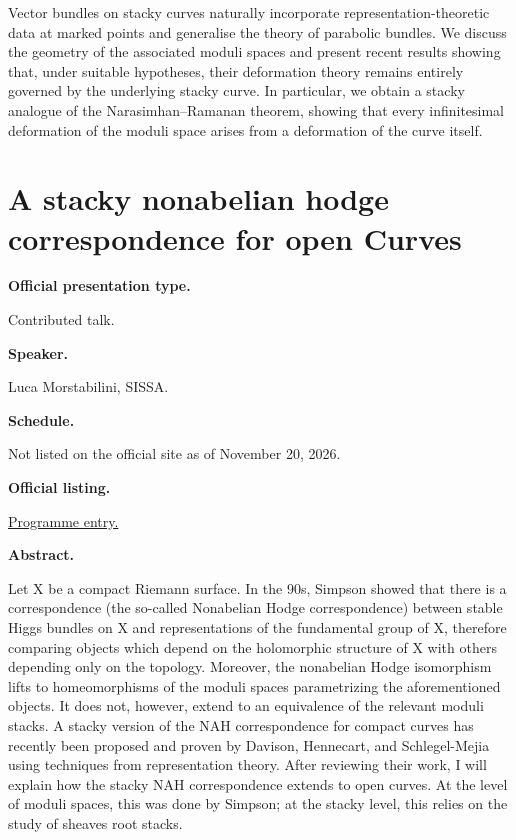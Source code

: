 Vector bundles on stacky curves naturally
incorporate representation-theoretic data at
marked points and generalise the theory of
parabolic bundles. We discuss the geometry of
the associated moduli spaces and present
recent results showing that, under suitable
hypotheses, their deformation theory remains
entirely governed by the underlying stacky
curve. In particular, we obtain a stacky
analogue of the Narasimhan–Ramanan theorem,
showing that every infinitesimal deformation
of the moduli space arises from a deformation
of the curve itself.

\section{A stacky nonabelian hodge
correspondence for open Curves}
\label{section-a-stacky-nonabelian-hodge}

\medskip\noindent
{\bf Official presentation type.}

Contributed talk.

\medskip\noindent
{\bf Speaker.}

Luca Morstabilini, SISSA.

\medskip\noindent
{\bf Schedule.}

Not listed on the official site as of
November 20, 2026.

\medskip\noindent
{\bf Official listing.}

\href{%
https://sites.google.com/view/%
geoalgcompluff/legal/%
legal-2027-resumos#h.dant8g3oe5ea%
}{Programme entry.}

\medskip\noindent
{\bf Abstract.}

Let X be a compact Riemann surface. In the
90s, Simpson showed that there is a
correspondence (the so-called Nonabelian
Hodge correspondence) between stable Higgs
bundles on X and representations of the
fundamental group of X, therefore comparing
objects which depend on the holomorphic
structure of X with others depending only on
the topology. Moreover, the nonabelian Hodge
isomorphism lifts to homeomorphisms of the
moduli spaces parametrizing the
aforementioned objects. It does not, however,
extend to an equivalence of the relevant
moduli stacks. A stacky version of the NAH
correspondence for compact curves has
recently been proposed and proven by Davison,
Hennecart, and Schlegel-Mejia using
techniques from representation theory. After
reviewing their work, I will explain how the
stacky NAH correspondence extends to open
curves. At the level of moduli spaces, this
was done by Simpson; at the stacky level,
this relies on the study of sheaves root
stacks.

